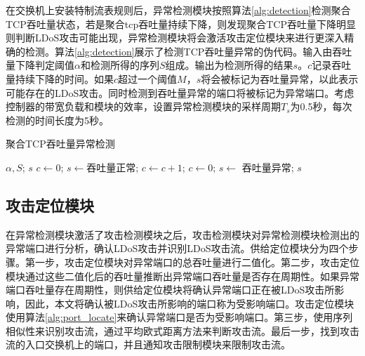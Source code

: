 在交换机上安装特制流表规则后，异常检测模块按照算法\ref{alg:detection}检测聚合TCP吞吐量状态，若是聚合tcp吞吐量持续下降，则发现聚合TCP吞吐量下降明显则判断LDoS攻击可能出现，异常检测模块将会激活攻击定位模块来进行更深入精确的检测。算法\ref{alg:detection}展示了检测TCP吞吐量异常的伪代码。输入由吞吐量下降判定阈值$\alpha$和检测所得的序列$S$组成。输出为检测所得的结果$s$。$c$记录吞吐量持续下降的时间。如果$c$超过一个阈值$M$，$s$将会被标记为吞吐量异常，以此表示可能存在的LDoS攻击。同时检测到吞吐量异常的端口将被标记为异常端口。考虑控制器的带宽负载和模块的效率，设置异常检测模块的采样周期$T_s$为0.5秒，每次检测的时间长度为5秒。

\renewcommand{\algorithmicrequire}{\textbf{输入:}}
\renewcommand{\algorithmicensure}{\textbf{输出:}}
\begin{algorithm}
	\small
	\caption{聚合TCP吞吐量异常检测}
	\label{alg:detection}
	\begin{algorithmic}[1]%
	\Require $\alpha, S$;
	\Ensure $s$
	\State $c \gets 0$;
	\State $s \gets $吞吐量正常;
			\State $c \gets c + 1$;
		\Else 
			\State $c \gets 0$;
		\EndIf
			\State $s \gets$ 吞吐量异常;
		\EndIf
	\EndFor
	\State \Return $s$
		
	\end{algorithmic}
\end{algorithm}

\subsection{攻击定位模块}
\label{chap4:Locator}

在异常检测模块激活了攻击检测模块之后，攻击检测模块对异常检测模块检测出的异常端口进行分析，确认LDoS攻击并识别LDoS攻击流。供给定位模块分为四个步骤。第一步，攻击定位模块对异常端口的总吞吐量进行二值化。第二步，攻击定位模块通过这些二值化后的吞吐量推断出异常端口吞吐量是否存在周期性。如果异常端口吞吐量存在周期性，则供给定位模块将确认异常端口正在被LDoS攻击所影响，因此，本文将确认被LDoS攻击所影响的端口称为受影响端口。攻击定位模块使用算法\ref{alg:port_locate}来确认异常端口是否为受影响端口。第三步，使用序列相似性来识别攻击流，通过平均欧式距离方法来判断攻击流。最后一步，找到攻击流的入口交换机上的端口，并且通知攻击限制模块来限制攻击流。




